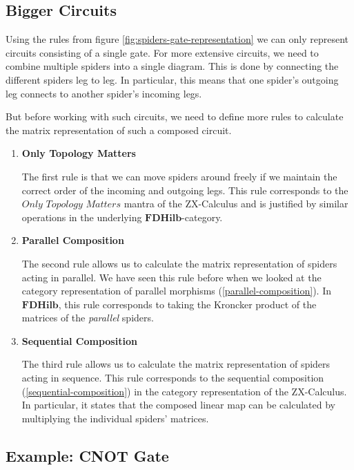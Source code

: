 \subsection{Bigger Circuits}

Using the rules from figure \ref{fig:spiders-gate-representation} we can only represent circuits consisting of a single gate. For more extensive circuits, we need to combine multiple spiders into a single diagram. This is done by connecting the different spiders leg to leg. In particular, this means that one spider's outgoing leg connects to another spider's incoming legs.

But before working with such circuits, we need to define more rules to calculate the matrix representation of such a composed circuit.

\begin{enumerate}

    \item \textbf{Only Topology Matters}

          The first rule is that we can move spiders around freely if we maintain the correct order of the incoming and outgoing legs. This rule corresponds to the $\textit{Only Topology Matters}$ mantra of the ZX-Calculus and is justified by similar operations in the underlying $\mathbf{FDHilb}$-category.

    \item \textbf{Parallel Composition}

          The second rule allows us to calculate the matrix representation of spiders acting in parallel. We have seen this rule before when we looked at the category representation of parallel morphisms (\ref{parallel-composition}). In $\mathbf{FDHilb}$, this rule corresponds to taking the Kroncker product of the matrices of the \textit{parallel} spiders.

    \item \textbf{Sequential Composition}

          The third rule allows us to calculate the matrix representation of spiders acting in sequence. This rule corresponds to the sequential composition (\ref{sequential-composition}) in the category representation of the ZX-Calculus. In particular, it states that the composed linear map can be calculated by multiplying the individual spiders' matrices.
\end{enumerate}

\subsection{Example: CNOT Gate}

